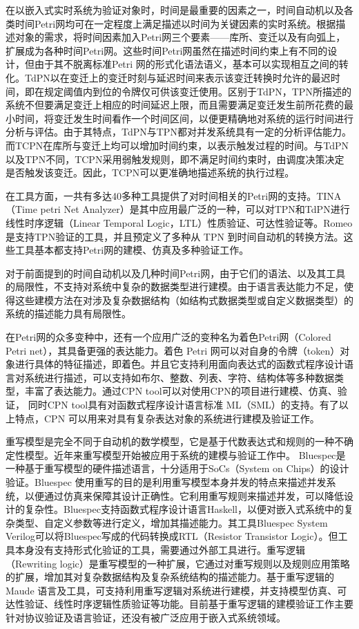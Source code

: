 在以嵌入式实时系统为验证对象时，时间是最重要的因素之一，时间自动机以及各类时间Petri网均可在一定程度上满足描述以时间为关键因素的实时系统。根据描述对象的需求，将时间因素加入Petri网三个要素——库所、变迁以及有向弧上，扩展成为各种时间Petri网。这些时间Petri网虽然在描述时间约束上有不同的设计，但由于其不脱离标准Petri 网的形式化语法语义，基本可以实现相互之间的转化。TdPN以在变迁上的变迁时刻与延迟时间来表示该变迁转换时允许的最迟时间，即在规定阈值内到位的令牌仅可供该变迁使用。区别于TdPN，TPN所描述的系统不但要满足变迁上相应的时间延迟上限，而且需要满足变迁发生前所花费的最小时间，将变迁发生时间看作一个时间区间，以便更精确地对系统的运行时间进行分析与评估。由于其特点，TdPN与TPN都对并发系统具有一定的分析评估能力。而TCPN在库所与变迁上均可以增加时间约束，以表示触发过程的时间。与TdPN以及TPN不同，TCPN采用弱触发规则，即不满足时间约束时，由调度决策决定是否触发该变迁。因此，TCPN可以更准确地描述系统的执行过程。

在工具方面，一共有多达40多种工具提供了对时间相关的Petri网的支持。TINA（Time petri Net Analyzer）是其中应用最广泛的一种，可以对TPN和TdPN进行线性时序逻辑（Linear Temporal Logic，LTL）性质验证、可达性验证等。Romeo是支持TPN验证的工具，并且预定义了多种从 TPN 到时间自动机的转换方法。这些工具基本都支持Petri网的建模、仿真及多种验证工作。

对于前面提到的时间自动机以及几种时间Petri网，由于它们的语法、以及其工具的局限性，不支持对系统中复杂的数据类型进行建模。由于语言表达能力不足，使得这些建模方法在对涉及复杂数据结构（如结构式数据类型或自定义数据类型）的系统的描述能力具有局限性。

在Petri网的众多变种中，还有一个应用广泛的变种名为着色Petri网（Colored Petri net），其具备更强的表达能力。着色 Petri 网可以对自身的令牌（token）对象进行具体的特征描述，即着色。并且它支持利用面向表达式的函数式程序设计语言对系统进行描述，可以支持如布尔、整数、列表、字符、结构体等多种数据类型，丰富了表达能力。通过CPN tool可以对使用CPN的项目进行建模、仿真、验证， 同时CPN tool具有对函数式程序设计语言标准 ML（SML）的支持。有了以上特点，CPN 可以用来对具有复杂表达对象的系统进行建模及验证工作。

重写模型是完全不同于自动机的数学模型，它是基于代数表达式和规则的一种不确定性模型。近年来重写模型开始被应用于系统的建模与验证工作中。 Bluespec是一种基于重写模型的硬件描述语言，十分适用于SoCs（System on Chips）的设计验证。Bluespec 使用重写的目的是利用重写模型本身并发的特点来描述并发系统，以便通过仿真来保障其设计正确性。它利用重写规则来描述并发，可以降低设计的复杂性。Bluespec支持函数式程序设计语言Haskell，以便对嵌入式系统中的复杂类型、自定义参数等进行定义，增加其描述能力。其工具Bluespec System Verilog可以将Bluespec写成的代码转换成RTL（Resistor Transistor Logic）。但工具本身没有支持形式化验证的工具，需要通过外部工具进行。重写逻辑（Rewriting logic）是重写模型的一种扩展，它通过对重写规则以及规则应用策略的扩展，增加其对复杂数据结构及复杂系统结构的描述能力。基于重写逻辑的 Maude 语言及工具，可支持利用重写逻辑对系统进行建模，并支持模型仿真、可达性验证、线性时序逻辑性质验证等功能。目前基于重写逻辑的建模验证工作主要针对协议验证及语言验证，还没有被广泛应用于嵌入式系统领域。





